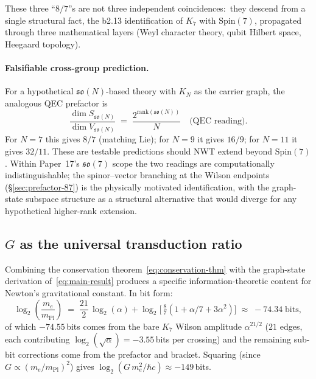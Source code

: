 \documentclass[11pt]{article}
\newcommand{\so}{\mathfrak{so}}
\newcommand{\Spin}{\mathrm{Spin}}
\newcommand{\mPl}{m_{\mathrm{Pl}}}
\newcommand{\rank}{\mathrm{rank}}
\begin{document}
These three ``$8/7$''s are not three independent coincidences:\
they descend from a single structural fact, the b2.13
identification of $K_7$ with $\Spin(7)$, propagated through three
mathematical layers (Weyl character theory, qubit Hilbert space,
Heegaard topology).

\paragraph{Falsifiable cross-group prediction.}
For a hypothetical $\so(N)$-based theory with $K_N$ as the carrier
graph, the analogous QEC prefactor is
\begin{equation}
  \frac{\dim S_{\so(N)}}{\dim V_{\so(N)}}
  \;=\;
  \frac{2^{\rank(\so(N))}}{N}
  \quad\text{(QEC reading)}.
  \label{eq:cross-group-prefactor}
\end{equation}
For $N = 7$ this gives $8/7$ (matching Lie); for $N = 9$ it gives
$16/9$; for $N = 11$ it gives $32/11$.  These are testable predictions
should NWT extend beyond $\Spin(7)$.  Within Paper~17's $\so(7)$
scope the two readings are computationally indistinguishable; the
spinor--vector branching at the Wilson endpoints
(\S\ref{sec:prefactor-87}) is the physically motivated identification,
with the graph-state subspace structure as a structural alternative
that would diverge for any hypothetical higher-rank extension.

\subsection{$G$ as the universal transduction ratio}
\label{sec:qec-G-transduction}

Combining the conservation theorem~\eqref{eq:conservation-thm} with
the graph-state derivation of~\eqref{eq:main-result} produces a
specific information-theoretic content for Newton's gravitational
constant.  In bit form:
\begin{equation}
  \log_2\!\!\left(\frac{m_e}{\mPl}\right)
  \;=\;
  \frac{21}{2}\,\log_2(\alpha)
  + \log_2\!\bigl[\,\tfrac{8}{7}(1 + \alpha/7 + 3\alpha^2)\bigr]
  \;\approx\; -74.34\;\text{bits},
  \label{eq:bits-of-mass}
\end{equation}
of which $-74.55$\,bits comes from the bare $K_7$ Wilson amplitude
$\alpha^{21/2}$ ($21$ edges, each contributing
$\log_2(\sqrt{\alpha}) = -3.55$\,bits per crossing) and the
remaining sub-bit corrections come from the prefactor and bracket.
Squaring (since $G \propto (m_e/\mPl)^2$) gives
$\log_2(G\,m_e^2/\hbar c) \approx -149$\,bits.
\end{document}
